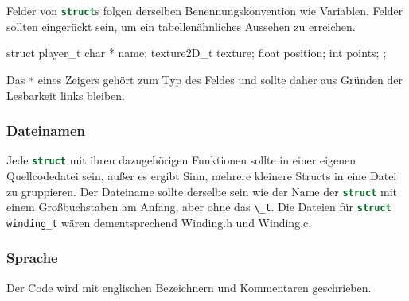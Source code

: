 \documentclass{homework-pp}
\renewcommand{\c}[1]{\lstinline[language=c,basicstyle=\ttfamily]|#1|}
\begin{document}
Felder von \c{struct}s folgen derselben Benennungskonvention wie Variablen. Felder sollten eingerückt sein, um ein tabellenähnliches Aussehen zu erreichen.

\begin{cblock}
struct player_t {
	char *		name;
	texture2D_t	texture;
	float		position;
	int			points;
};
\end{cblock}

Das \c{*} eines Zeigers gehört zum Typ des Feldes und sollte daher aus Gründen der Lesbarkeit links bleiben.

\subsubsection{Dateinamen}

Jede \c{struct} mit ihren dazugehörigen Funktionen sollte in einer eigenen Quellcodedatei sein, außer es ergibt Sinn, mehrere kleinere Structs in eine Datei zu gruppieren. Der Dateiname sollte derselbe sein wie der Name der \c{struct} mit einem Großbuchstaben am Anfang, aber ohne das \c{\_t}. Die Dateien für \c{struct winding_t} wären dementsprechend Winding.h und Winding.c.

\subsubsection{Sprache}

Der Code wird mit englischen Bezeichnern und Kommentaren geschrieben.
\end{document}
